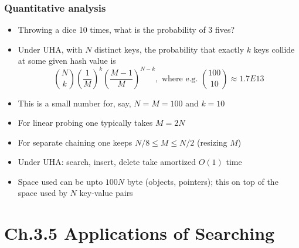 \documentclass[handout]{beamer}
\begin{document}
\begin{frame}[fragile]
    \frametitle{Quantitative analysis}

\begin{itemize}[<+->]
\item Throwing a dice 10 times, what is the probability of 3 fives?
\item Under UHA, with $N$ distinct keys, the probability that exactly $k$ keys collide at some given hash value is
\[ \binom{N}{k} (\frac{1}{M})^k  (\frac{M-1}{M})^{N-k},\text{ where e.g. } \binom{100}{10}\approx 1.7 E 13\]
\item This is a small number for, say, $N=M=100$ and $k=10$
\item For linear probing one typically takes $M=2N$
\item For separate chaining one keeps $N/8 \leq M \leq N/2$ (resizing $M$)
\item Under UHA: search, insert, delete take amortized $O(1)$ time
\item Space used can be upto $100N$ byte (objects, pointers); 
this on top of the space used by $N$ key-value pairs
\end{itemize}
\end{frame}


\section{Ch.3.5 Applications of Searching}
\end{document}
